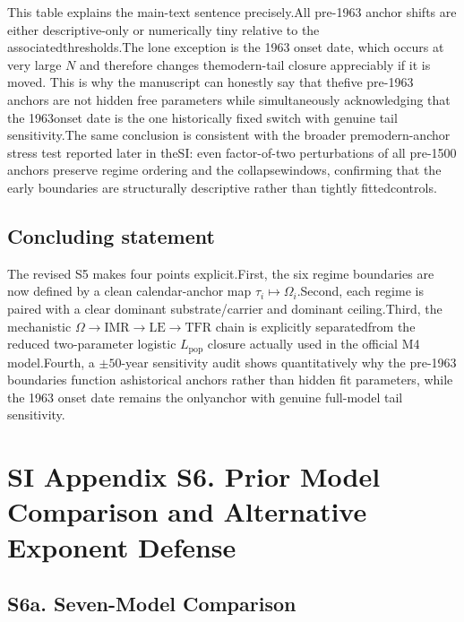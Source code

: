 \documentclass[11pt]{article}
\newcommand{\IMR}{\mathrm{IMR}}
\newcommand{\LE}{\mathrm{LE}}
\newcommand{\TFR}{\mathrm{TFR}}
\begin{document}
This table explains the main-text sentence precisely.All pre-1963 anchor shifts are either descriptive-only or numerically tiny relative to the associatedthresholds.The lone exception is the 1963 onset date, which occurs at very large $N$ and therefore changes themodern-tail closure appreciably if it is moved. This is why the manuscript can honestly say that thefive pre-1963 anchors are not hidden free parameters while simultaneously acknowledging that the 1963onset date is the one historically fixed switch with genuine tail sensitivity.The same conclusion is consistent with the broader premodern-anchor stress test reported later in theSI: even factor-of-two perturbations of all pre-1500 anchors preserve regime ordering and the collapsewindows, confirming that the early boundaries are structurally descriptive rather than tightly fittedcontrols.
\subsection*{Concluding statement}\label{subsec:S5_conclusion}
The revised S5 makes four points explicit.First, the six regime boundaries are now defined by a clean calendar-anchor map $\tau_i\mapsto\Omega_i$.Second, each regime is paired with a clear dominant substrate/carrier and dominant ceiling.Third, the mechanistic $\Omega\rightarrow\IMR\rightarrow\LE\rightarrow\TFR$ chain is explicitly separatedfrom the reduced two-parameter logistic $L_{\mathrm{pop}}$ closure actually used in the official M4 model.Fourth, a $\pm 50$-year sensitivity audit shows quantitatively why the pre-1963 boundaries function ashistorical anchors rather than hidden fit parameters, while the 1963 onset date remains the onlyanchor with genuine full-model tail sensitivity.



\section*{SI Appendix S6. Prior Model Comparison and Alternative Exponent Defense}
\label{sec:S6_prior_models}

\subsection*{S6a. Seven-Model Comparison}
\end{document}
